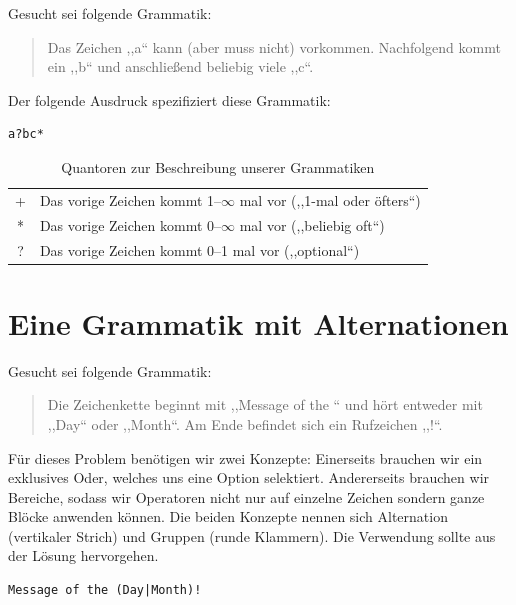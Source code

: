 Gesucht sei folgende Grammatik:
\begin{quote}
  Das Zeichen ,,a`` kann (aber muss nicht) vorkommen. Nachfolgend kommt ein ,,b`` und anschließend beliebig viele ,,c``.
\end{quote}

Der folgende Ausdruck spezifiziert diese Grammatik:
\begin{lstlisting}
a?bc*
\end{lstlisting}

\begin{table}[h]
 \begin{center}
  \begin{tabular}{cl}
   \hline
    + & Das vorige Zeichen kommt 1--$\infty$ mal vor (,,1-mal oder öfters``) \\
    * & Das vorige Zeichen kommt 0--$\infty$ mal vor (,,beliebig oft``) \\
    ? & Das vorige Zeichen kommt 0--1 mal vor (,,optional``) \\
   \hline
  \end{tabular}
  \caption{Quantoren zur Beschreibung unserer Grammatiken}
  \label{tab:quantifiers}
 \end{center}
\end{table}

\section{Eine Grammatik mit Alternationen}
%
Gesucht sei folgende Grammatik:
\begin{quote}
  Die Zeichenkette beginnt mit ,,Message of the `` und hört entweder mit ,,Day`` oder ,,Month``. Am Ende befindet sich ein Rufzeichen ,,!``.
\end{quote}

Für dieses Problem benötigen wir zwei Konzepte: Einerseits brauchen wir ein exklusives Oder, welches uns eine Option selektiert. Andererseits brauchen wir Bereiche, sodass wir Operatoren nicht nur auf einzelne Zeichen sondern ganze Blöcke anwenden können. Die beiden Konzepte nennen sich Alternation (vertikaler Strich) und Gruppen (runde Klammern). Die Verwendung sollte aus der Lösung hervorgehen.

\begin{lstlisting}
Message of the (Day|Month)!
\end{lstlisting}

